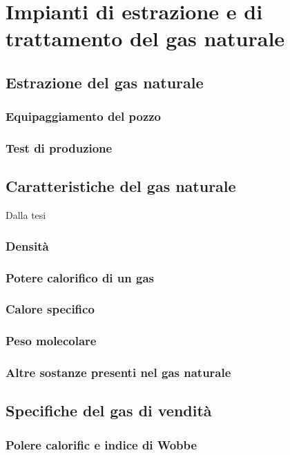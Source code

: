 \clearpage{\pagestyle{empty}\cleardoublepage}
\chapter{Impianti di estrazione e di trattamento del gas naturale}

\section{Estrazione del gas naturale}
\subsection{Equipaggiamento del pozzo}
\subsection{Test di produzione}

\section{Caratteristiche del gas naturale}
Dalla tesi
\subsection{Densità}
\subsection{Potere calorifico di un gas}
\subsection{Calore specifico}
\clearpage{\pagestyle{empty}\cleardoublepage}
\subsection{Peso molecolare}
\subsection{Altre sostanze presenti nel gas naturale}

\section{Specifiche del gas di vendità}
\subsection{Polere calorific e indice di Wobbe}
